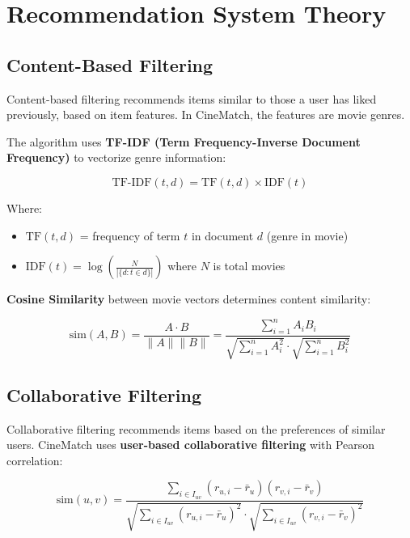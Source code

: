 \documentclass[12pt,a4paper]{report}
\begin{document}
\section{Recommendation System Theory}

\subsection{Content-Based Filtering}

Content-based filtering recommends items similar to those a user has liked previously, based on item features. In CineMatch, the features are movie genres.

The algorithm uses \textbf{TF-IDF (Term Frequency-Inverse Document Frequency)} to vectorize genre information:

\begin{equation}
\text{TF-IDF}(t, d) = \text{TF}(t, d) \times \text{IDF}(t)
\end{equation}

Where:
\begin{itemize}
    \item $\text{TF}(t,d)$ = frequency of term $t$ in document $d$ (genre in movie)
    \item $\text{IDF}(t) = \log\left(\frac{N}{|\{d: t \in d\}|}\right)$ where $N$ is total movies
\end{itemize}

\textbf{Cosine Similarity} between movie vectors determines content similarity:

\begin{equation}
\text{sim}(A, B) = \frac{A \cdot B}{\|A\| \|B\|} = \frac{\sum_{i=1}^{n} A_i B_i}{\sqrt{\sum_{i=1}^{n} A_i^2} \cdot \sqrt{\sum_{i=1}^{n} B_i^2}}
\end{equation}

\subsection{Collaborative Filtering}

Collaborative filtering recommends items based on the preferences of similar users. CineMatch uses \textbf{user-based collaborative filtering} with Pearson correlation:

\begin{equation}
\text{sim}(u, v) = \frac{\sum_{i \in I_{uv}} (r_{u,i} - \bar{r}_u)(r_{v,i} - \bar{r}_v)}{\sqrt{\sum_{i \in I_{uv}} (r_{u,i} - \bar{r}_u)^2} \cdot \sqrt{\sum_{i \in I_{uv}} (r_{v,i} - \bar{r}_v)^2}}
\end{equation}
\end{document}
